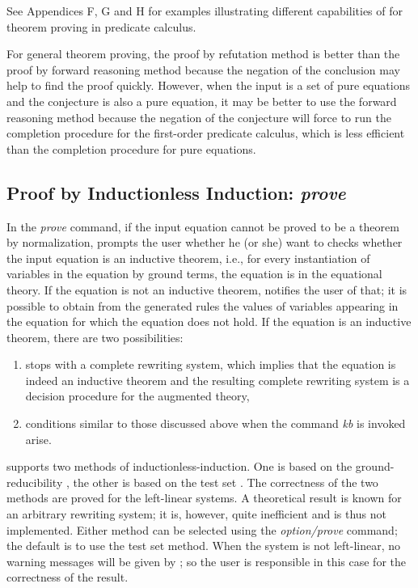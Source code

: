 See Appendices F, G and H for examples illustrating different
capabilities of \RRL for theorem proving in predicate calculus.

For general theorem proving, the proof by refutation method
is better than the proof by forward reasoning method because
the negation of the conclusion may help to find the proof quickly.
However, when the input is a set of pure equations and the conjecture
is also a pure equation, it may be better to use
the forward reasoning method because the negation of the conjecture
will force \RRL to run the completion procedure
for the first-order predicate calculus, which is less efficient
than the completion procedure for pure equations.

\subsection{Proof by Inductionless Induction: \em prove} 

In the {\em prove} command, if the
input equation cannot be proved to be a theorem by normalization, 
\RRL prompts the user whether he (or she) want to checks
whether the input equation is an inductive theorem, i.e., for every
instantiation of variables in the equation by ground terms, the
equation is in the equational theory.  If the equation is not an
inductive theorem, \RRL notifies the user of that; it is possible to
obtain from the generated rules the values of variables appearing in
the equation for which the equation does not hold. If the equation is
an inductive theorem, there are two possibilities: 
\begin{enumerate}
\item
\RRL stops with
a complete rewriting system, which implies that the equation is indeed
an inductive theorem and the resulting complete rewriting system is a
decision procedure for the augmented theory, 
\item
conditions similar
to those discussed above when the command {\em kb} is invoked arise.
\end{enumerate}  

\RRL supports two methods of inductionless-induction. One is based on
the ground-reducibility \cite{JK86}, the other is based on
the test set \cite{KNZ86}.  The correctness of the two methods are
proved for the left-linear systems. A theoretical result is known for
an arbitrary rewriting system; it is, however, quite inefficient
and is thus not implemented. Either method can be selected 
using the {\em option/prove} command; the default is to
use the test set method. When the system is not left-linear,
no warning messages will be given by \ERRL; so the user is responsible
in this case for the correctness of the result.
  
